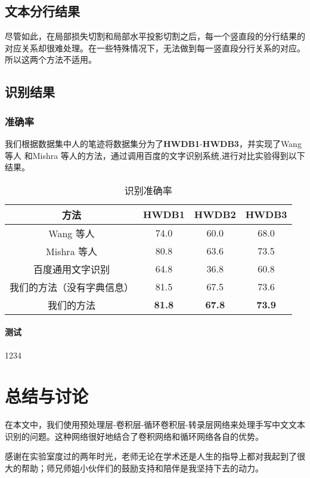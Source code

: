 \documentclass[winfonts, thesis]{njuthesis}
\begin{document}
\begin{spacing}{1.625}
\section{文本分行结果}
尽管如此，在局部损失切割和局部水平投影切割之后，每一个竖直段的分行结果的对应关系却很难处理。在一些特殊情况下，无法做到每一竖直段分行关系的对应。所以这两个方法不适用。




\section{识别结果}

\subsection{准确率}
我们根据数据集中人的笔迹将数据集分为了\textbf{HWDB1}-\textbf{HWDB3}，并实现了Wang 等人\cite{wang2012end} 和Mishra 等人\cite{mishra2012scene}的方法，通过调用百度的文字识别系统\cite{baiduapi},进行对比实验得到以下结果。

\vspace{0.2cm}
\begin{table}[htbp]
\setlength{\belowcaptionskip}{5pt}
  \centering
  \begin{tabular}{cccc}
    \toprule
    \textbf{方法} & \textbf{HWDB1} & \textbf{HWDB2} & \textbf{HWDB3} \\
    \midrule
    Wang 等人\cite{wang2012end}   			& 74.0 & 60.0 & 68.0  \\
    Mishra 等人\cite{mishra2012scene}		 	& 80.8 & 63.6 & 73.5  \\
    百度通用文字识别\cite{baiduapi}		& 64.8 & 36.8 & 60.8 \\
    \midrule
    我们的方法（没有字典信息）& 81.5 & 67.5 & 73.6  \\
    我们的方法	  		& \textbf{81.8} & \textbf{67.8} & \textbf{73.9}  \\
    \bottomrule
  \end{tabular}
  \vspace{0.2cm}
  \caption{识别准确率}\label{table:result}
\end{table}

\subsubsection{测试}
1234

\chapter{总结与讨论}
在本文中，我们使用预处理层-卷积层-循环卷积层-转录层网络来处理手写中文文本识别的问题。这种网络很好地结合了卷积网络和循环网络各自的优势。



\begin{acknowledgement}
感谢在实验室度过的两年时光，老师无论在学术还是人生的指导上都对我起到了很大的帮助；师兄师姐小伙伴们的鼓励支持和陪伴是我坚持下去的动力。
\end{acknowledgement}

\end{spacing}
\end{document}
